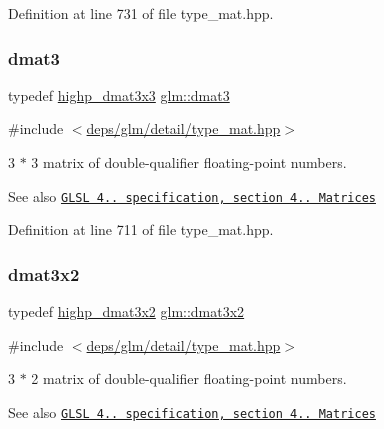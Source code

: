 Definition at line 731 of file type\+\_\+mat.\+hpp.

\mbox{\label{group__core__types_ga25fd62195c3ef5ac0d32ead1dbfbb929}} 
\subsubsection{\texorpdfstring{dmat3}{dmat3}}
{\footnotesize\ttfamily typedef \hyperlink{group__core__precision_gae5f677e4437523476511c84a17206ac2}{highp\+\_\+dmat3x3} \hyperlink{group__core__types_ga25fd62195c3ef5ac0d32ead1dbfbb929}{glm\+::dmat3}}



{\ttfamily \#include $<$\hyperlink{type__mat_8hpp}{deps/glm/detail/type\+\_\+mat.\+hpp}$>$}

3 $\ast$ 3 matrix of double-\/qualifier floating-\/point numbers.

\begin{DoxySeeAlso}{See also}
\href{http://www.opengl.org/registry/doc/GLSLangSpec.4.20.8.pdf}{\tt G\+L\+SL 4.. specification, section 4.. Matrices} 
\end{DoxySeeAlso}


Definition at line 711 of file type\+\_\+mat.\+hpp.

\mbox{\label{group__core__types_ga2db259d2e7921065c5b7d4dca9547960}} 
\subsubsection{\texorpdfstring{dmat3x2}{dmat3x2}}
{\footnotesize\ttfamily typedef \hyperlink{group__core__precision_ga8454b92a3917b17a8663f2409cb3100d}{highp\+\_\+dmat3x2} \hyperlink{group__core__types_ga2db259d2e7921065c5b7d4dca9547960}{glm\+::dmat3x2}}



{\ttfamily \#include $<$\hyperlink{type__mat_8hpp}{deps/glm/detail/type\+\_\+mat.\+hpp}$>$}

3 $\ast$ 2 matrix of double-\/qualifier floating-\/point numbers.

\begin{DoxySeeAlso}{See also}
\href{http://www.opengl.org/registry/doc/GLSLangSpec.4.20.8.pdf}{\tt G\+L\+SL 4.. specification, section 4.. Matrices} 
\end{DoxySeeAlso}


